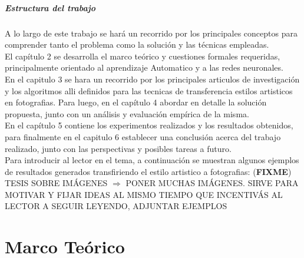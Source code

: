 \documentclass[a4paper,11pt,spanish]{book}
\newcommand*{\FIXME}[1]{{(\textbf{FIXME}) {#1}}}
\begin{document}
  \paragraph{Estructura del trabajo}
    A lo largo de este trabajo se hará un recorrido por los principales conceptos para comprender tanto el problema como la solución y las técnicas empleadas.\\
    El capítulo 2 se desarrolla el marco teórico y cuestiones formales requeridas, principalmente orientado al aprendizaje Automatico y a las redes neuronales.\\
    En el capitulo 3 se hara un recorrido por los principales articulos de investigación y los algoritmos alli definidos para las tecnicas de transferencia estilos artisticos en fotografias.
    Para luego, en el capítulo 4 abordar en detalle la solución propuesta, junto con un análisis y evaluación empírica de la misma.\\
    En el capítulo 5 contiene los experimentos realizados y los resultados obtenidos, para finalmente en el capitulo 6 establecer una conclusión acerca del trabajo realizado, 
    junto con las perspectivas y posibles tareas a futuro.\\

Para introducir al lector en el tema, a continuación se muestran algunos ejemplos de resultados generados transfiriendo el estilo artistico a fotografias:
\FIXME{TESIS SOBRE IMÁGENES $\Rightarrow$ PONER MUCHAS IMÁGENES. SIRVE PARA MOTIVAR Y FIJAR IDEAS AL MISMO TIEMPO QUE INCENTIVÁS AL LECTOR A SEGUIR LEYENDO, ADJUNTAR EJEMPLOS}



\chapter{Marco Teórico}

\end{document}
